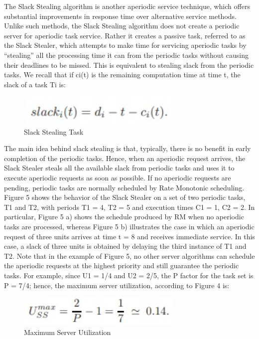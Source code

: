 \documentclass[conference]{IEEEtran}
\begin{document}
The Slack Stealing algorithm is another aperiodic service technique, which offers substantial improvements in response time over alternative service methods. Unlike such methods, the Slack Stealing algorithm does not create a periodic server for aperiodic task
service. Rather it creates a passive task, referred to as the Slack Stealer, which attempts
to make time for servicing aperiodic tasks by “stealing” all the processing time it can
from the periodic tasks without causing their deadlines to be missed. This is equivalent to stealing slack from the periodic tasks. We recall that if ci(t) is the remaining computation time at time t, the slack of a task Ti is: 

\begin{figure}[h!]
	\includegraphics[width=8cm, height=1.5cm]{alg1.jpg}
	\caption{Slack Stealing Task}
	\centering
\end{figure}

The main idea behind slack stealing is that, typically, there is no benefit in early completion of the periodic tasks. Hence, when an aperiodic request arrives, the Slack Stealer steals all the available slack from periodic tasks and uses it to execute aperiodic requests as soon as possible. If no aperiodic requests are pending, periodic tasks
are normally scheduled by Rate Monotonic scheduling.
Figure 5 shows the behavior of the Slack Stealer on a set of two periodic tasks,
T1 and T2, with periods T1 = 4, T2 = 5 and execution times C1 = 1, C2 = 2. In
particular, Figure 5 a) shows the schedule produced by RM when no aperiodic tasks
are processed, whereas Figure 5 b) illustrates the case in which an aperiodic request
of three units arrives at time t = 8 and receives immediate service. In this case, a slack
of three units is obtained by delaying the third instance of T1 and T2.
Note that in the example of Figure 5, no other server algorithms can schedule the aperiodic requests at the highest priority and still guarantee the
periodic tasks. For example, since U1 = 1/4 and U2 = 2/5, the P factor for the task
set is P = 7/4; hence, the maximum server utilization, according to Figure 4
is:

\begin{figure}[h!]
	\includegraphics[width=8cm, height=1.5cm]{alg2}
	\caption{ Maximum Server Utilization}
	\centering
\end{figure}
\end{document}
